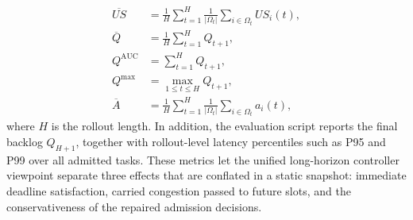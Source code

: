 \begin{align}
    \overline{US} &= \frac{1}{H}\sum_{t=1}^{H}\frac{1}{|\Omega_t|}\sum_{i \in \Omega_t} US_i(t),\\
    \overline{Q} &= \frac{1}{H}\sum_{t=1}^{H} Q_{t+1},\\
    Q^{\mathrm{AUC}} &= \sum_{t=1}^{H} Q_{t+1},\\
    Q^{\max} &= \max_{1 \le t \le H} Q_{t+1},\\
    \overline{A} &= \frac{1}{H}\sum_{t=1}^{H}\frac{1}{|\Omega_t|}\sum_{i \in \Omega_t} a_i(t),
\end{align}
where $H$ is the rollout length. In addition, the evaluation script reports the final backlog $Q_{H+1}$, together with rollout-level latency percentiles such as P95 and P99 over all admitted tasks. These metrics let the unified long-horizon controller viewpoint separate three effects that are conflated in a static snapshot: immediate deadline satisfaction, carried congestion passed to future slots, and the conservativeness of the repaired admission decisions.

